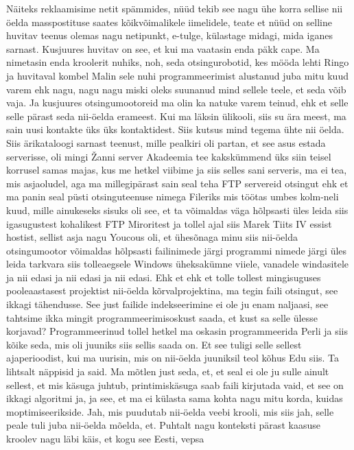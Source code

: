 Näiteks reklaamisime netit spämmides, nüüd tekib see nagu ühe korra sellise nii öelda masspostituse saates kõikvõimalikele iimelidele, teate et nüüd on selline huvitav teenus olemas nagu netipunkt, e-tulge, külastage midagi, mida iganes sarnast. Kusjuures huvitav on see, et kui ma vaatasin enda päkk cape. Ma nimetasin enda kroolerit nuhiks, noh, seda otsingurobotid, kes mööda lehti Ringo ja huvitaval kombel Malin sele nuhi programmeerimist alustanud juba mitu kuud varem ehk nagu, nagu nagu miski oleks suunanud mind sellele teele, et seda võib vaja. Ja kusjuures otsingumootoreid ma olin ka natuke varem teinud, ehk et selle selle pärast seda nii-öelda erameest. Kui ma läksin ülikooli, siis su ära meest, ma sain uusi kontakte üks üks kontaktidest. Siis kutsus mind tegema ühte nii öelda.
Siis ärikataloogi sarnast teenust, mille pealkiri oli partan, et see asus estada serverisse, oli mingi Žanni server Akadeemia tee kakskümmend üks siin teisel korrusel samas majas, kus me hetkel viibime ja siis selles sani serveris, ma ei tea, mis asjaoludel, aga ma millegipärast sain seal teha FTP servereid otsingut ehk et ma panin seal püsti otsinguteenuse nimega Fileriks mis töötas umbes kolm-neli kuud, mille ainukeseks sisuks oli see, et ta võimaldas väga hõlpsasti üles leida siis igasugustest kohalikest FTP Miroritest ja tollel ajal siis Marek Tiits IV essist hostist, sellist asja nagu Youcous oli, et ühesõnaga minu siis nii-öelda otsingumootor võimaldas hõlpsasti failinimede järgi programmi nimede järgi üles leida tarkvara siis tolleaegsele Windows üheksakümne viiele, vanadele windasitele ja nii edasi ja nii edasi ja nii edasi. Ehk et ehk et tolle tollest mingisuguses pooleaastasest projektist nii-öelda kõrvalprojektina, ma tegin faili otsingut, see ikkagi tähendusse.
See just failide indekseerimine ei ole ju enam naljaasi, see tahtsime ikka mingit programmeerimisoskust saada, et kust sa selle ülesse korjavad?
Programmeerinud tollel hetkel ma oskasin programmeerida Perli ja siis kõike seda, mis oli juuniks siis sellis saada on. Et see tuligi selle sellest ajaperioodist, kui ma uurisin, mis on nii-öelda juuniksil teol kõhus
Edu siis.
Ta lihtsalt näppisid ja said. Ma mõtlen just seda, et, et seal ei ole ju sulle ainult sellest, et mis käsuga juhtub, printimiskäsuga saab faili kirjutada vaid, et see on ikkagi algoritmi ja, ja see, et ma ei külasta sama kohta nagu mitu korda, kuidas moptimiseerikside.
Jah, mis puudutab nii-öelda veebi krooli, mis siis jah, selle peale tuli juba nii-öelda mõelda, et.
Puhtalt nagu konteksti pärast kaasuse kroolev nagu läbi käis, et kogu see Eesti, vepsa
